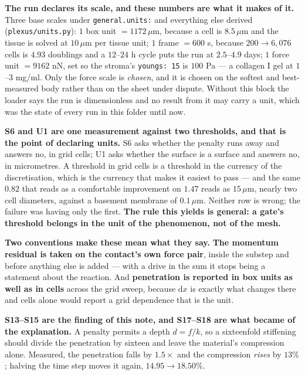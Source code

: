\documentclass[10pt,a4paper]{article}
\newcommand{\code}[1]{\texttt{#1}}
\begin{document}
\textbf{The run declares its scale, and these numbers are what it makes of it.} Three base scales
under \code{general.units:} and everything else derived (\code{plexus/units.py}): $1$ box unit
$=1172\,\mu$m, because a cell is $8.5\,\mu$m and the tissue is solved at $10\,\mu$m per tissue
unit; $1$ frame $=600$ s, because $200\to6{,}076$ cells is $4.93$ doublings and a $12$--$24$ h
cycle puts the run at $2.5$--$4.9$ days; $1$ force unit $=9162$ nN, set so the stroma's
\code{youngs: 15} is $100$ Pa --- a collagen I gel at $1$--$3$ mg/ml. Only the force scale is
\emph{chosen}, and it is chosen on the softest and best-measured body rather than on the sheet under
dispute. Without this block the loader says the run is dimensionless and no result from it may carry
a unit, which was the state of every run in this folder until now.

\textbf{S6 and U1 are one measurement against two thresholds, and that is the point of declaring
units.} S6 asks whether the penalty runs away and answers no, in grid cells; U1 asks whether the
surface is a surface and answers no, in micrometres. A threshold in grid cells is a threshold in the
currency of the discretisation, which is the currency that makes it easiest to pass --- and the same
$0.82$ that reads as a comfortable improvement on $1.47$ reads as $15\,\mu$m, nearly two cell
diameters, against a basement membrane of $0.1\,\mu$m. Neither row is wrong; the failure was having
only the first. \textbf{The rule this yields is general: a gate's threshold belongs in the unit of the
phenomenon, not of the mesh.}

\textbf{Two conventions make these mean what they say.} \textbf{The momentum residual is taken on the
contact's own force pair}, inside the substep and before anything else is added --- with a drive in the
sum it stops being a statement about the reaction. And \textbf{penetration is reported in box units as
well as in cells} across the grid sweep, because $\mathrm dx$ is exactly what changes there and cells
alone would report a grid dependence that is the unit.

\textbf{S13--S15 are the finding of this note, and S17--S18 are what became of the explanation.} A penalty permits a depth
$d=f/k$, so a sixteenfold stiffening should divide the penetration by sixteen and leave the material's
compression alone. Measured, the penetration falls by $1.5\times$ and the compression \emph{rises} by
$13\%$; halving the time step moves it again, $14.95\to18.50\%$.
\end{document}
